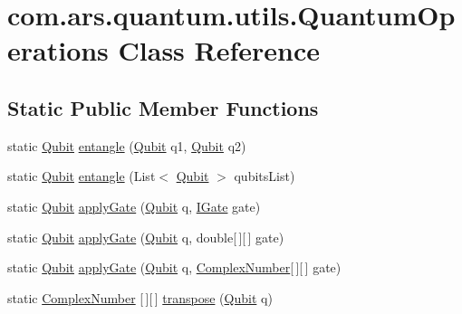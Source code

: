 \hypertarget{classcom_1_1ars_1_1quantum_1_1utils_1_1_quantum_operations}{}\section{com.\+ars.\+quantum.\+utils.\+Quantum\+Operations Class Reference}
\label{classcom_1_1ars_1_1quantum_1_1utils_1_1_quantum_operations}
\subsection*{Static Public Member Functions}
\begin{DoxyCompactItemize}
\item 
static \hyperlink{classcom_1_1ars_1_1qubits_1_1_qubit}{Qubit} \hyperlink{classcom_1_1ars_1_1quantum_1_1utils_1_1_quantum_operations_aea9e037d8e8f70173be3feb5ee89ddc4}{entangle} (\hyperlink{classcom_1_1ars_1_1qubits_1_1_qubit}{Qubit} q1, \hyperlink{classcom_1_1ars_1_1qubits_1_1_qubit}{Qubit} q2)
\item 
static \hyperlink{classcom_1_1ars_1_1qubits_1_1_qubit}{Qubit} \hyperlink{classcom_1_1ars_1_1quantum_1_1utils_1_1_quantum_operations_a07fa9b19071084da9dee99b449fc2e26}{entangle} (List$<$ \hyperlink{classcom_1_1ars_1_1qubits_1_1_qubit}{Qubit} $>$ qubits\+List)
\item 
static \hyperlink{classcom_1_1ars_1_1qubits_1_1_qubit}{Qubit} \hyperlink{classcom_1_1ars_1_1quantum_1_1utils_1_1_quantum_operations_a3d1e394a18ae308ebaec070e49ae8f8d}{apply\+Gate} (\hyperlink{classcom_1_1ars_1_1qubits_1_1_qubit}{Qubit} q, \hyperlink{interfacecom_1_1ars_1_1gates_1_1_i_gate}{I\+Gate} gate)
\item 
static \hyperlink{classcom_1_1ars_1_1qubits_1_1_qubit}{Qubit} \hyperlink{classcom_1_1ars_1_1quantum_1_1utils_1_1_quantum_operations_a9481454be27aa6f92182c9d635d81017}{apply\+Gate} (\hyperlink{classcom_1_1ars_1_1qubits_1_1_qubit}{Qubit} q, double\mbox{[}$\,$\mbox{]}\mbox{[}$\,$\mbox{]} gate)
\item 
static \hyperlink{classcom_1_1ars_1_1qubits_1_1_qubit}{Qubit} \hyperlink{classcom_1_1ars_1_1quantum_1_1utils_1_1_quantum_operations_adbf2c6d628ae274e0c8e68d8712c2732}{apply\+Gate} (\hyperlink{classcom_1_1ars_1_1qubits_1_1_qubit}{Qubit} q, \hyperlink{classcom_1_1ars_1_1complexnumbers_1_1_complex_number}{Complex\+Number}\mbox{[}$\,$\mbox{]}\mbox{[}$\,$\mbox{]} gate)
\item 
static \hyperlink{classcom_1_1ars_1_1complexnumbers_1_1_complex_number}{Complex\+Number} \mbox{[}$\,$\mbox{]}\mbox{[}$\,$\mbox{]} \hyperlink{classcom_1_1ars_1_1quantum_1_1utils_1_1_quantum_operations_aa93536fa306fcff162cc9cbde2f89356}{transpose} (\hyperlink{classcom_1_1ars_1_1qubits_1_1_qubit}{Qubit} q)

\end{DoxyCompactItemize}
